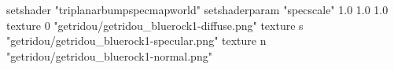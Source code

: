 setshader "triplanarbumpspecmapworld"
setshaderparam "specscale" 1.0 1.0 1.0
texture 0 "getridou/getridou_bluerock1-diffuse.png"
texture s "getridou/getridou_bluerock1-specular.png"
texture n "getridou/getridou_bluerock1-normal.png"
